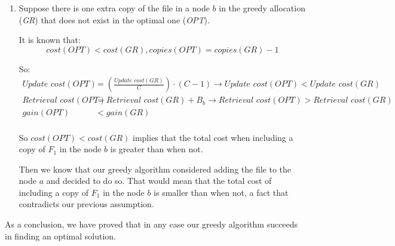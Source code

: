 \begin{enumerate}
  \item Suppose there is one extra copy of the file in a node $b$ in the greedy allocation (\textit{GR}) that does not exist in the optimal one (\textit{OPT}).

It is known that: 
$$ cost(OPT) < cost(GR), copies(OPT) = copies(GR) - 1 $$

So: 
\begin{align*}
  \textit{Update cost}(OPT) &= (\frac{\textit{Update cost}(GR)}{C}) \cdot (C-1) \rightarrow \textit{Update cost}(OPT) < \textit{Update cost}(GR) \\
  \textit{Retrieval cost}(OPT) &= \textit{Retrieval cost}(GR) + B_b \rightarrow \textit{Retrieval cost}(OPT) >   \textit{Retrieval cost}(GR) \\
  gain(OPT) &< gain(GR) \\
\end{align*}

So $cost(OPT) < cost(GR)$ implies that the total cost when including a copy of $F_1$ in the node $b$ is greater than when not.

Then we know that our greedy algorithm considered adding the file to the node $a$ and decided to do so. That would mean that the total cost of including a copy of $F_1$ in the node $b$ is smaller than when not, a fact that contradicts our previous assumption.

\end{enumerate}

As a conclusion, we have proved that in any case our greedy algorithm succeeds in finding an optimal solution.



